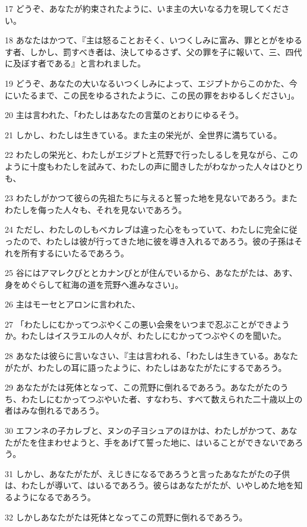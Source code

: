 \par 17 どうぞ、あなたが約束されたように、いま主の大いなる力を現してください。
\par 18 あなたはかつて、『主は怒ることおそく、いつくしみに富み、罪ととがをゆるす者、しかし、罰すべき者は、決してゆるさず、父の罪を子に報いて、三、四代に及ぼす者である』と言われました。
\par 19 どうぞ、あなたの大いなるいつくしみによって、エジプトからこのかた、今にいたるまで、この民をゆるされたように、この民の罪をおゆるしください」。
\par 20 主は言われた、「わたしはあなたの言葉のとおりにゆるそう。
\par 21 しかし、わたしは生きている。また主の栄光が、全世界に満ちている。
\par 22 わたしの栄光と、わたしがエジプトと荒野で行ったしるしを見ながら、このように十度もわたしを試みて、わたしの声に聞きしたがわなかった人々はひとりも、
\par 23 わたしがかつて彼らの先祖たちに与えると誓った地を見ないであろう。またわたしを侮った人々も、それを見ないであろう。
\par 24 ただし、わたしのしもべカレブは違った心をもっていて、わたしに完全に従ったので、わたしは彼が行ってきた地に彼を導き入れるであろう。彼の子孫はそれを所有するにいたるであろう。
\par 25 谷にはアマレクびととカナンびとが住んでいるから、あなたがたは、あす、身をめぐらして紅海の道を荒野へ進みなさい」。
\par 26 主はモーセとアロンに言われた、
\par 27 「わたしにむかってつぶやくこの悪い会衆をいつまで忍ぶことができようか。わたしはイスラエルの人々が、わたしにむかってつぶやくのを聞いた。
\par 28 あなたは彼らに言いなさい、『主は言われる、「わたしは生きている。あなたがたが、わたしの耳に語ったように、わたしはあなたがたにするであろう。
\par 29 あなたがたは死体となって、この荒野に倒れるであろう。あなたがたのうち、わたしにむかってつぶやいた者、すなわち、すべて数えられた二十歳以上の者はみな倒れるであろう。
\par 30 エフンネの子カレブと、ヌンの子ヨシュアのほかは、わたしがかつて、あなたがたを住まわせようと、手をあげて誓った地に、はいることができないであろう。
\par 31 しかし、あなたがたが、えじきになるであろうと言ったあなたがたの子供は、わたしが導いて、はいるであろう。彼らはあなたがたが、いやしめた地を知るようになるであろう。
\par 32 しかしあなたがたは死体となってこの荒野に倒れるであろう。
